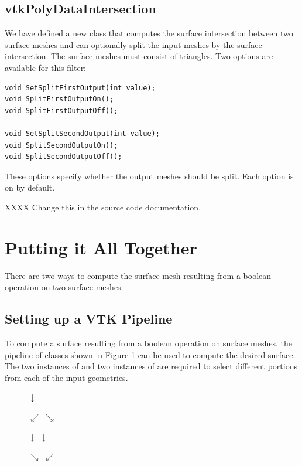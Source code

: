 \documentclass{InsightArticle}
\begin{document}
\subsection{vtkPolyDataIntersection}

We have defined a new class  that computes the surface intersection between two surface meshes and can optionally split the input meshes by the surface intersection. The surface meshes must consist of triangles. Two options are available for this filter:
\begin{verbatim}
void SetSplitFirstOutput(int value);
void SplitFirstOutputOn();
void SplitFirstOutputOff();

void SetSplitSecondOutput(int value);
void SplitSecondOutputOn();
void SplitSecondOutputOff();
\end{verbatim}
These options specify whether the output meshes should be split. Each option is on by default.

XXXX Change this in the source code documentation.

\section{Putting it All Together}

There are two ways to compute the surface mesh resulting from a boolean operation on two surface meshes.

\subsection{Setting up a VTK Pipeline}

To compute a surface resulting from a boolean operation on surface meshes, the pipeline of classes shown in Figure \ref{fig:Pipeline} can be used to compute the desired surface. The two instances of  and two instances of  are required to select different portions from each of the input geometries.

\begin{figure}[h]
\begin{center}

$\downarrow$


$\swarrow$ \hspace{3em} $\searrow$

 

$\downarrow$ \hspace{5em}  $\downarrow$

 

$\searrow$ \hspace{3em} $\swarrow$

\end{center}
\label{fig:Pipeline}
\end{figure}
\end{document}
